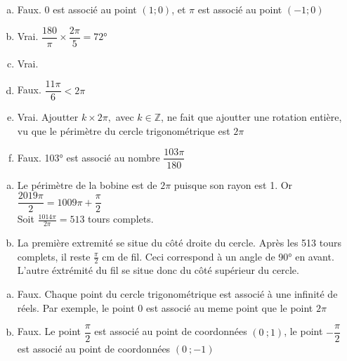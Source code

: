\documentclass[12pt]{book}
\begin{document}
\begin{Exercise}[number={47}]
    \begin{enumerate}[a)]
        \item Faux. 0 est associé au point $(1;0)$, et $\pi$ est associé au point $(-1;0)$
        \item Vrai. $\dfrac{180}{\pi}\times\dfrac{2\pi}{5}=\ang{72}$
        \item Vrai.
        \item Faux. $\dfrac{11\pi}{6}<2\pi$
        \item Vrai. Ajoutter $k\times2\pi,$ avec $k\in \mathbb{Z}$, ne fait que ajoutter une rotation entière, vu que le périmètre du cercle trigonométrique est $2\pi$
        \item Faux. \ang{103} est associé au nombre $\dfrac{103\pi}{180}$
    \end{enumerate}
\end{Exercise}

\begin{Exercise}[number={50}]
    \begin{enumerate}[a)]
        \item Le périmètre de la bobine est de $2\pi$ puisque son rayon est 1. Or $\dfrac{2019\pi}{2}=1009\pi+\dfrac{\pi}{2}$ \\ Soit $\frac{1014\pi}{2\pi}=513$ tours complets.
        \item La première extremité se situe du côté droite du cercle. Après les 513 tours complets, il reste $\frac{\pi}{2}$ cm de fil. Ceci correspond à un angle de \ang{90} en avant. L'autre éxtrémité du fil se situe donc du côté supérieur du cercle.
    \end{enumerate}
\end{Exercise}

\begin{Exercise}[number={52}]
    \begin{enumerate}[a)]
        \item Faux. Chaque point du cercle trigonométrique est associé à une infinité de réels. Par exemple, le point 0 est associé au meme point que le point $2\pi$
        \item Faux. Le point $\dfrac{\pi}{2}$ est associé au point de coordonnées $(0\ ;1)$, le point $-\dfrac{\pi}{2}$ est associé au point de coordonnées $(0\ ;-1)$
    \end{enumerate}
\end{Exercise}
\end{document}
